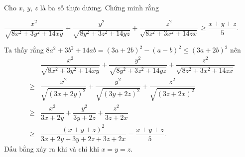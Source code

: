 \begin{ex}%
	Cho $x$, $y$, $z$ là ba số thực dương. Chứng minh rằng
	\begin{center}
		$\dfrac{x^2}{\sqrt{8x^2+3y^2+14xy}}+\dfrac{y^2}{\sqrt{8y^2+3z^2+14yz}}+\dfrac{z^2}{\sqrt{8z^2+3x^2+14zx}}\ge \dfrac{x+y+z}{5}.$
	\end{center}
	\loigiai
	{
		Ta  thấy rằng $8a^2+3b^2+14ab=(3a+2b)^2-(a-b)^2\le (3a+2b)^2$ nên
		\begin{eqnarray*}
			& &\dfrac{x^2}{\sqrt{8x^2+3y^2+14xy}}+\dfrac{y^2}{\sqrt{8y^2+3z^2+14yz}}+\dfrac{z^2}{\sqrt{8z^2+3x^2+14zx}}\\
			&\ge &\dfrac{x^2}{\sqrt{\left(3x+2y\right)^2}}+\dfrac{y^2}{\sqrt{\left(3y+2z\right)^2}}+\dfrac{z^2}{\sqrt{\left(3z+2x\right)^2}}\\
			&\ge & \dfrac{x^2}{3x+2y}+\dfrac{y^2}{3y+2z}+\dfrac{z^2}{3z+2x}\\
			&\ge & \dfrac{(x+y+z)^2}{3x+2y+3y+2z+3z+2x}=\dfrac{x+y+z}{5}.
		\end{eqnarray*}
		Dấu bằng xảy ra khi và chỉ khi $x=y=z.$
	}
\end{ex}

